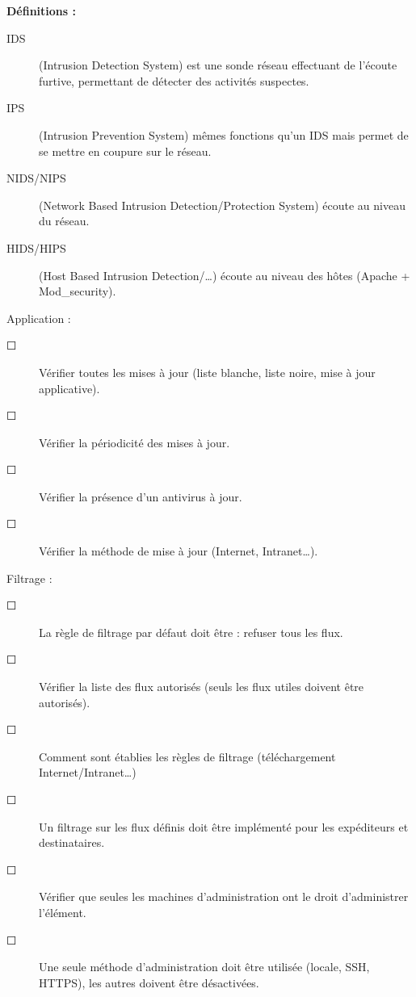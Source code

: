 \documentclass[a4paper,11pt]{article}				    %
\begin{document}
{
\textbf{D\'efinitions :} 
\begin{description}
	\item[IDS] (Intrusion Detection System) est une sonde r\'eseau effectuant de l'\'ecoute furtive, permettant de d\'etecter des activit\'es suspectes.
	\item[IPS] (Intrusion Prevention System) m\^emes fonctions qu'un IDS mais permet de se mettre en coupure sur le r\'eseau.
	\item[NIDS/NIPS] (Network Based Intrusion Detection/Protection System) \'ecoute au niveau du r\'eseau.
	\item[HIDS/HIPS] (Host Based Intrusion Detection/\dots{}) \'ecoute au niveau des h\^otes (Apache + Mod\_security).\\
\end{description}

\begin{LARGE}Application : \end{LARGE}
\begin{description}
    \item[$\Square$] V\'erifier toutes les mises \`a jour (liste blanche, liste noire, mise \`a jour applicative).
    \item[$\Square$] V\'erifier la p\'eriodicit\'e des mises \`a jour.
    \item[$\Square$] V\'erifier la pr\'esence d'un antivirus \`a jour.
    \item[$\Square$] V\'erifier la m\'ethode de mise \`a jour (Internet, Intranet\dots{}).\\
\end{description}

\begin{LARGE}Filtrage : \end{LARGE}
\begin{description}
    \item[$\Square$] La r\`egle de filtrage par d\'efaut doit \^etre : refuser tous les flux.
    \item[$\Square$] V\'erifier la liste des flux autoris\'es (seuls les flux utiles doivent \^etre autoris\'es).
	 \item[$\Square$] Comment sont \'etablies les r\`egles de filtrage (t\'el\'echargement Internet/Intranet\dots{})
    \item[$\Square$] Un filtrage sur les flux d\'efinis doit \^etre impl\'ement\'e pour les exp\'editeurs et destinataires.
    \item[$\Square$] V\'erifier que seules les machines d'administration ont le droit d'administrer l'\'el\'ement.
    \item[$\Square$] Une seule m\'ethode d'administration doit \^etre utilis\'ee (locale, SSH, HTTPS), les autres doivent \^etre d\'esactiv\'ees.\\
\end{description}

}
\end{document}
